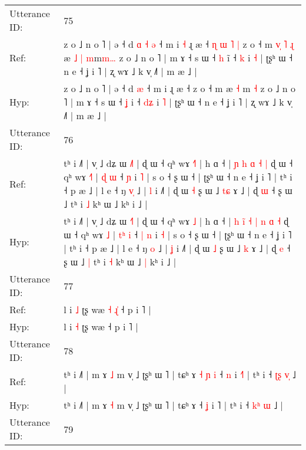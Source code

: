 \documentclass[10pt]{article}
\DeclareRobustCommand{\hl}[1]{{\textcolor{red}{#1}}}
\begin{document}
\begin{longtable}{ll}
 \\
\midrule
Utterance ID: & 75 \\
Ref: & z o ˩ n o ˥ | ə ˧ d\hl{ }\hl{ɑ}\hl{ }\hl{˧} \hl{ə} ˧ m i\hl{ }\hl{˧} ɻ æ ˧\hl{ }\hl{ɳ}\hl{ }\hl{ɯ}\hl{ }\hl{˥}\hl{ }\hl{|} z o ˧ m\hl{ }\hl{v}\hl{̩}\hl{ }\hl{˥}\hl{ }\hl{ɻ} æ\hl{ }\hl{˩} \hl{|} \hl{m}m\hl{m}\hl{…} z o ˩ n o ˥ | m ɤ ˧ s ɯ ˧ \hl{h} i\hl{̃} ˧ \hl{}\hl{k} i \hl{˧} | ʈʂʰ ɯ ˧ n e ˧ ʝ i ˥ | ʐ wɤ ˩ k v̩ ˩˥ | m æ ˩ |
 \\
Hyp: & z o ˩ n o ˥ | ə ˧ d\hl{}\hl{}\hl{}\hl{} \hl{æ} ˧ m i\hl{}\hl{} ɻ æ ˧\hl{}\hl{}\hl{}\hl{}\hl{}\hl{}\hl{}\hl{} z o ˧ m\hl{}\hl{}\hl{}\hl{}\hl{}\hl{}\hl{} æ\hl{}\hl{} \hl{˧} \hl{}m\hl{ }\hl{˧} z o ˩ n o ˥ | m ɤ ˧ s ɯ ˧ \hl{ʝ} i\hl{} ˧ \hl{d}\hl{ʑ} i \hl{˥} | ʈʂʰ ɯ ˧ n e ˧ ʝ i ˥ | ʐ wɤ ˩ k v̩ ˩˥ | m æ ˩ |
 \\
\midrule
Utterance ID: & 76 \\
Ref: & tʰ i ˩˥ | v̩ ˩ dʑ ɯ \hl{˩}˥ | ɖ ɯ ˧ qʰ wɤ \hl{˧}\hl{˥} | h ɑ ˧ |\hl{}\hl{}\hl{}\hl{}\hl{} \hl{ɲ} \hl{h} \hl{ɑ} \hl{˧} \hl{|} ɖ ɯ ˧ qʰ wɤ \hl{˧}\hl{˥} | \hl{}\hl{ɖ} \hl{ɯ} ˧\hl{}\hl{} \hl{ɲ} i \hl{˥} | s o ˧ ʂ ɯ ˧ | ʈʂʰ ɯ ˧ n e ˧ ʝ i ˥ | tʰ i ˧ p æ ˩ | l e ˧ ŋ \hl{v}\hl{̩} ˩ | \hl{l} i ˩˥ | ɖ ɯ \hl{˧} ʂ ɯ ˩ \hl{t}\hl{ɕ} ɤ ˩ | ɖ \hl{ɯ} ˧ ʂ ɯ ˩\hl{}\hl{} tʰ i \hl{˩} kʰ ɯ ˩\hl{}\hl{} kʰ i ˩ |
 \\
Hyp: & tʰ i ˩˥ | v̩ ˩ dʑ ɯ \hl{˧}˥ | ɖ ɯ ˧ qʰ wɤ \hl{}\hl{˩} | h ɑ ˧ |\hl{ }\hl{h}\hl{ }\hl{i}\hl{̃} \hl{˧} \hl{|} \hl{n} \hl{ɑ} \hl{˧} ɖ ɯ ˧ qʰ wɤ \hl{}\hl{˩} | \hl{t}\hl{ʰ} \hl{i} ˧\hl{ }\hl{|} \hl{n} i \hl{˧} | s o ˧ ʂ ɯ ˧ | ʈʂʰ ɯ ˧ n e ˧ ʝ i ˥ | tʰ i ˧ p æ ˩ | l e ˧ ŋ \hl{}\hl{o} ˩ | \hl{ʝ} i ˩˥ | ɖ ɯ \hl{˩} ʂ ɯ ˩ \hl{}\hl{k} ɤ ˩ | ɖ \hl{e} ˧ ʂ ɯ ˩\hl{ }\hl{|} tʰ i \hl{˧} kʰ ɯ ˩\hl{ }\hl{|} kʰ i ˩ |
 \\
\midrule
Utterance ID: & 77 \\
Ref: & l i \hl{˩} ʈʂ wæ\hl{ }\hl{˧}\hl{ }\hl{ɻ}\hl{̍} ˧ p i ˥ |
 \\
Hyp: & l i \hl{˧} ʈʂ wæ\hl{}\hl{}\hl{}\hl{}\hl{} ˧ p i ˥ |
 \\
\midrule
Utterance ID: & 78 \\
Ref: & tʰ i ˩˥ | m ɤ \hl{˩} m v̩ ˩ ʈʂʰ ɯ ˥ | tɕʰ ɤ\hl{ }\hl{˧}\hl{ }\hl{ɲ}\hl{ }\hl{i} ˧ \hl{n} i \hl{˧}˥ | tʰ i ˧ \hl{ʈ}\hl{ʂ} \hl{v}\hl{̩} ˩ |
 \\
Hyp: & tʰ i ˩˥ | m ɤ \hl{˧} m v̩ ˩ ʈʂʰ ɯ ˥ | tɕʰ ɤ\hl{}\hl{}\hl{}\hl{}\hl{}\hl{} ˧ \hl{ʝ} i \hl{}˥ | tʰ i ˧ \hl{k}\hl{ʰ} \hl{}\hl{ɯ} ˩ |
 \\
\midrule
Utterance ID: & 79 \\

\end{longtable}
\end{document}

